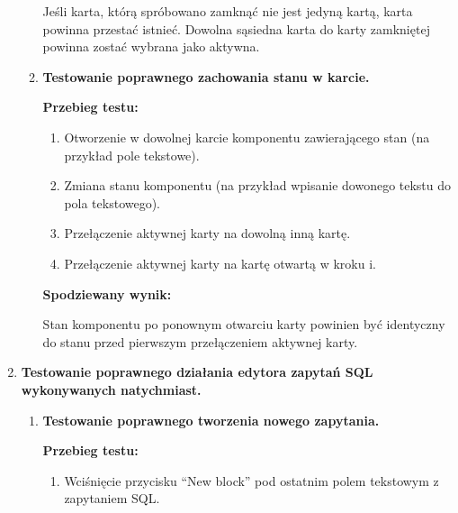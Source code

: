 \begin{enumerate}
\begin{enumerate}
                Jeśli karta, którą spróbowano zamknąć nie jest jedyną kartą,
                karta powinna przestać istnieć. Dowolna sąsiedna karta do karty
                zamkniętej powinna zostać wybrana jako aktywna.

            \item \textbf{Testowanie poprawnego zachowania stanu w karcie.}

                \textbf{Przebieg testu:}

                \begin{enumerate}

                    \item Otworzenie w dowolnej karcie komponentu zawierającego
                        stan (na przykład pole tekstowe).

                    \item Zmiana stanu komponentu (na przykład wpisanie dowonego
                        tekstu do pola tekstowego).

                    \item Przełączenie aktywnej karty na dowolną inną kartę.

                    \item Przełączenie aktywnej karty na kartę otwartą w kroku
                        i.

                \end{enumerate}

                \textbf{Spodziewany wynik:}

                Stan komponentu po ponownym otwarciu karty powinien być
                identyczny do stanu przed pierwszym przełączeniem aktywnej
                karty.

        \end{enumerate}

    \item \textbf{Testowanie poprawnego działania edytora zapytań SQL
        wykonywanych natychmiast.}

        \begin{enumerate}

            \item \textbf{Testowanie poprawnego tworzenia nowego zapytania.}

                \textbf{Przebieg testu:}

                \begin{enumerate}

                    \item Wciśnięcie przycisku ``New block'' pod ostatnim
                        polem tekstowym z zapytaniem SQL.


\end{enumerate}
\end{enumerate}
\end{enumerate}
